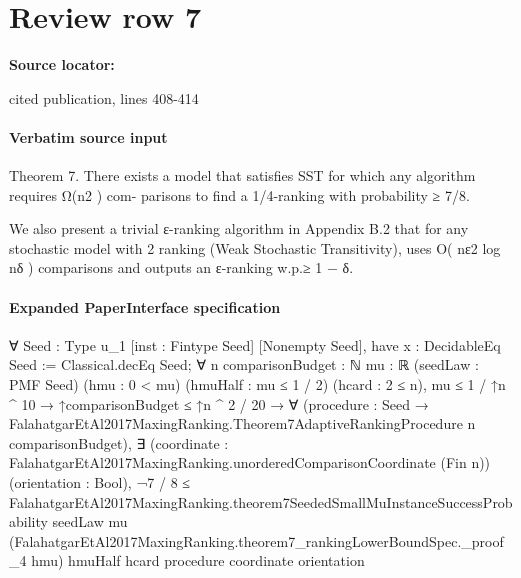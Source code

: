 \documentclass[10pt]{article}
\begin{document}
\section*{Review row 7}
\textbf{Source locator:} {\footnotesize\raggedright cited publication, lines 408-\allowbreak{}414\par}
\paragraph{Verbatim source input}
\begin{ReviewVerbatim}
Theorem 7. There exists a model that satisfies SST for which any algorithm requires Ω(n2 ) com-
parisons to find a 1/4-ranking with probability ≥ 7/8.

We also present a trivial ε-ranking algorithm in Appendix B.2 that for any stochastic model with
                                                  2
ranking (Weak Stochastic Transitivity), uses O( nε2 log nδ ) comparisons and outputs an ε-ranking
w.p.≥ 1 − δ.
\end{ReviewVerbatim}



\paragraph{Expanded PaperInterface specification}
\begin{ReviewVerbatim}
∀ {Seed : Type u_1} [inst : Fintype Seed] [Nonempty Seed],
  have x : DecidableEq Seed := Classical.decEq Seed;
  ∀ {n comparisonBudget : ℕ} {mu : ℝ} (seedLaw : PMF Seed) (hmu : 0 < mu) (hmuHalf : mu ≤ 1 / 2) (hcard : 2 ≤ n),
    mu ≤ 1 / ↑n ^ 10 →
      ↑comparisonBudget ≤ ↑n ^ 2 / 20 →
        ∀ (procedure : Seed → FalahatgarEtAl2017MaxingRanking.Theorem7AdaptiveRankingProcedure n comparisonBudget),
          ∃ (coordinate : FalahatgarEtAl2017MaxingRanking.unorderedComparisonCoordinate (Fin n)) (orientation : Bool),
            ¬7 / 8 ≤
                FalahatgarEtAl2017MaxingRanking.theorem7SeededSmallMuInstanceSuccessProbability seedLaw mu
                  (FalahatgarEtAl2017MaxingRanking.theorem7_rankingLowerBoundSpec._proof_4 hmu) hmuHalf hcard procedure
                  coordinate orientation
\end{ReviewVerbatim}
\end{document}
